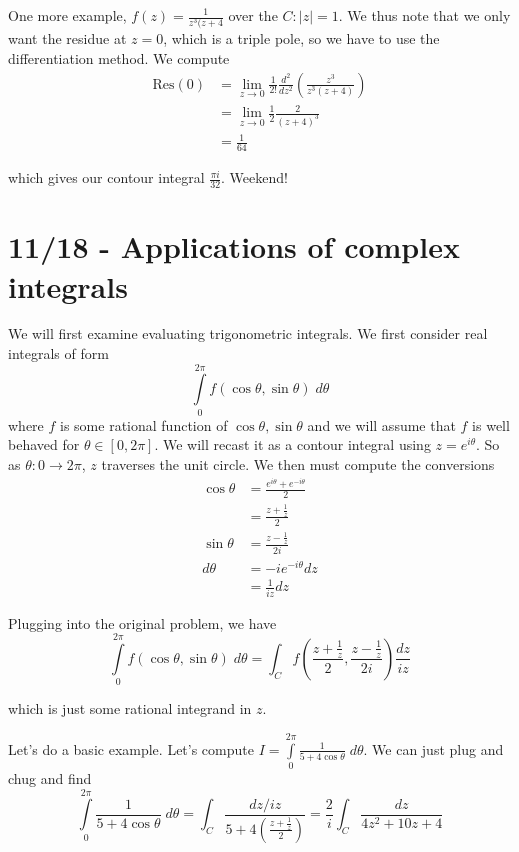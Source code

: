 \documentclass[10pt]{report}
\newcommand{\abs}[1]{\left|#1\right|}
\newcommand{\Res}[0]{\mathrm{Res} }
\begin{document}
One more example, $f(z) = \frac{1}{z^3(z+4}$ over the $C: \abs{z} = 1$. We thus note that we only want the residue at $z=0$, which is a triple pole, so we have to use the differentiation method. We compute
\begin{align*}
    \Res(0) &= \lim_{z \to 0} \frac{1}{2!} \frac{d^2}{dz^2}\left( \frac{z^3}{z^3(z+4)} \right)\\
    &= \lim_{z \to 0} \frac{1}{2} \frac{2}{(z+4)^3}\\
    &= \frac{1}{64}
\end{align*}

which gives our contour integral $\frac{\pi i}{32}$. Weekend!

\chapter{11/18 - Applications of complex integrals}

We will first examine evaluating trigonometric integrals. We first consider real integrals of form
$$\displaystyle\int\limits_{0}^{2\pi}f(\cos \theta, \sin \theta)\;d\theta$$
where $f$ is some rational function of $\cos \theta, \sin \theta$ and we will assume that $f$ is well behaved for $\theta \in \left[ 0,2\pi \right]$. We will recast it as a contour integral using $z = e^{i\theta}$. So as $\theta: 0\to 2\pi$, $z$ traverses the unit circle. We then must compute the conversions
\begin{align*}
    \cos \theta &= \frac{e^{i\theta} + e^{-i\theta}}{2}\\
    &= \frac{z + \frac{1}{z}}{2}\\
    \sin \theta &= \frac{z - \frac{1}{z}}{2i}\\
    d\theta &= -ie^{-i\theta} dz\\
    &= \frac{1}{iz} dz
\end{align*}

Plugging into the original problem, we have
$$\displaystyle\int\limits_{0}^{2\pi}f(\cos \theta, \sin \theta)\;d\theta = \int_C f\left( \frac{z + \frac{1}{z}}{2}, \frac{z - \frac{1}{z}}{2i} \right) \frac{dz}{iz}$$

which is just some rational integrand in $z$.  

Let's do a basic example. Let's compute $I = \displaystyle\int\limits_{0}^{2\pi}\frac{1}{5 + 4\cos \theta}\;d\theta$. We can just plug and chug and find
$$\displaystyle\int\limits_{0}^{2\pi}\frac{1}{5 + 4\cos \theta}\;d\theta = \int_C \frac{dz/iz}{5+4\left(\frac{z+\frac{1}{z}}{2}  \right)} = \frac{2}{i}\int_C \frac{dz}{4z^2 + 10z + 4}$$
\end{document}
